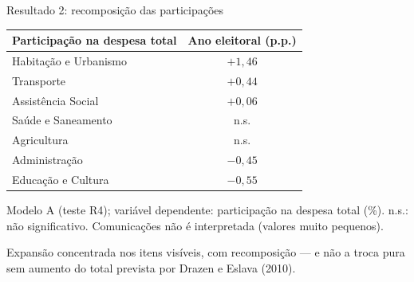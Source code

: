 \documentclass[aspectratio=169,9pt]{beamer}
\begin{document}
\begin{frame}{Resultado 2: recomposição das participações}
  \begin{center}
    \begin{tabular}{lc}
      \toprule
      \textbf{Participação na despesa total} & \textbf{Ano eleitoral (p.p.)} \\
      \midrule
      Habitação e Urbanismo & $+1{,}46$ \\
      Transporte            & $+0{,}44$ \\
      Assistência Social    & $+0{,}06$ \\
      Saúde e Saneamento    & n.s. \\
      Agricultura           & n.s. \\
      Administração         & $-0{,}45$ \\
      Educação e Cultura    & $-0{,}55$ \\
      \bottomrule
    \end{tabular}
  \end{center}
  {\scriptsize Modelo A (teste R4); variável dependente: participação na despesa total (\%). n.s.: não significativo. Comunicações não é interpretada (valores muito pequenos).\par}
  \vspace{0.5em}
  \alert{Expansão concentrada nos itens visíveis, com recomposição} --- e não a troca pura sem aumento do total prevista por Drazen e Eslava (2010).
\end{frame}
\end{document}
